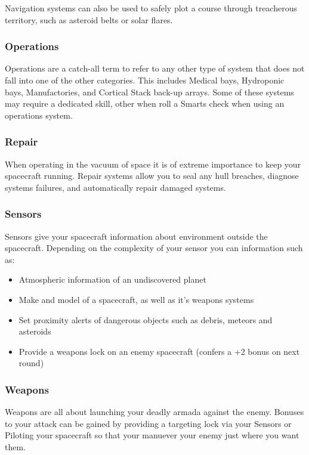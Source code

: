 \begin{multicols}{2}
Navigation systems can also be used to safely plot a course through treacherous territory, such as asteroid belts or solar flares.

\subsubsection{Operations}

Operations are a catch-all term to refer to any other type of system that does not fall into one of the other categories. This includes Medical bays, Hydroponic bays, Manufactories, and Cortical Stack back-up arrays. Some of these systems may require a dedicated skill, other when roll a Smarts check when using an operations system.

\subsubsection{Repair}

When operating in the vacuum of space it is of extreme importance to keep your spacecraft running. Repair systems allow you to seal any hull breaches, diagnose systems failures, and automatically repair damaged systems.

\subsubsection{Sensors}

Sensors give your spacecraft information about environment outside the spacecraft. Depending on the complexity of your sensor you can information such as:

\begin{itemize}
  \item Atmospheric information of an undiscovered planet
  \item Make and model of a spacecraft, as well as it's weapons systems
  \item Set proximity alerts of dangerous objects such as debris, meteors and asteroids
  \item Provide a weapons lock on an enemy spacecraft (confers a +2 bonus on next round)
\end{itemize}

\subsubsection{Weapons}

Weapons are all about launching your deadly armada against the enemy. Bonuses to your attack can be gained by providing a targeting lock via your Sensors or Piloting your spacecraft so that your manuever your enemy just where you want them.

\end{multicols}

